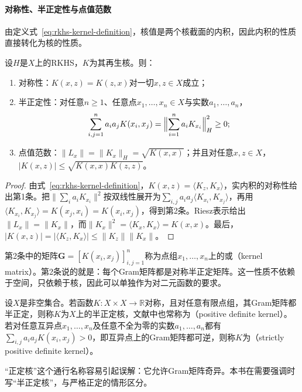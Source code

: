 \paragraph{对称性、半正定性与点值范数}

由定义式~\eqref{eq:rkhs-kernel-definition}，核值是两个核截面的内积，因此内积的性质直接转化为核的性质。

\begin{theorem}[再生核的基本性质]
\label{thm:rkhs-kernel-properties}
设$H$是$X$上的RKHS，$K$为其再生核。则：
\begin{enumerate}
\item 对称性：$K(x,z)=K(z,x)$对一切$x,z\in X$成立；
\item 半正定性：对任意$n\ge1$、任意点$x_1,\ldots,x_n\in X$与实数$a_1,\ldots,a_n$，
\[
\sum_{i,j=1}^na_ia_jK(x_i,x_j)=\Bigl\|\sum_{i=1}^na_iK_{x_i}\Bigr\|_H^2\ge0 ;
\]
\item 点值范数：$\|L_x\|=\|K_x\|_H=\sqrt{K(x,x)}$；并且对任意$x,z\in X$，$|K(x,z)|\le\sqrt{K(x,x)K(z,z)}$。
\end{enumerate}
\end{theorem}

\begin{proof}
由式~\eqref{eq:rkhs-kernel-definition}，$K(x,z)=\langle K_z,K_x\rangle$，实内积的对称性给出第1条。把$\bigl\|\sum_ia_iK_{x_i}\bigr\|^2$按双线性展开为$\sum_{i,j}a_ia_j\langle K_{x_i},K_{x_j}\rangle$，再用$\langle K_{x_i},K_{x_j}\rangle=K(x_j,x_i)=K(x_i,x_j)$，得到第2条。Riesz表示给出$\|L_x\|=\|K_x\|$，而$\|K_x\|^2=\langle K_x,K_x\rangle=K(x,x)$。最后，$|K(x,z)|=|\langle K_z,K_x\rangle|\le\|K_z\|\|K_x\|$。
\end{proof}

第2条中的矩阵$\bm G=[K(x_i,x_j)]_{i,j=1}^n$称为点组$x_1,\ldots,x_n$上的或（kernel matrix）。第2条说的就是：每个Gram矩阵都是对称半正定矩阵。这一性质不依赖于空间，只依赖于核，因此可以单独作为对二元函数的要求。

\begin{definition}[半正定核与严格正定核]
\label{def:rkhs-psd-kernel}
设$X$是非空集合。若函数$K:X\times X\to\mathbb R$对称，且对任意有限点组，其Gram矩阵都半正定，则称$K$为$X$上的半正定核，文献中也常称为（positive definite kernel）。若对任意互异点$x_1,\ldots,x_n$及任意不全为零的实数$a_1,\ldots,a_n$都有$\sum_{i,j}a_ia_jK(x_i,x_j)>0$，即互异点上的Gram矩阵都可逆，则称$K$为（strictly positive definite kernel）。
\end{definition}

“正定核”这个通行名称容易引起误解：它允许Gram矩阵奇异。本书在需要强调时写“半正定核”，与严格正定的情形区分。

